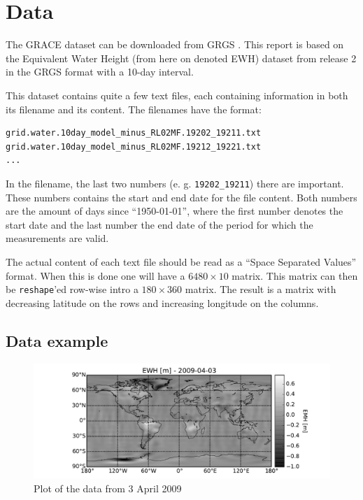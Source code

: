 \section{Data}

The GRACE dataset can be downloaded from GRGS \cite{GRACE-data-source}.
This report is based on the Equivalent Water Height (from here on denoted EWH)  dataset  from release 2 in the GRGS format with a 10-day interval.

This dataset contains quite a few text files, each containing information in both its filename and its content.
The filenames have the format:

\begin{lstlisting}
grid.water.10day_model_minus_RL02MF.19202_19211.txt
grid.water.10day_model_minus_RL02MF.19212_19221.txt
...
\end{lstlisting}

In the filename, the last two numbers (e. g. \texttt{19202\_19211}) there are important.
These numbers contains the start and end date for the file content.
Both numbers are the amount of days since ``1950-01-01'', where the first number denotes the start date and the last number the end date of the period for which the measurements are valid. \cite{GRACE-data-format-dates}

The actual content of each text file should be read as a ``Space Separated Values'' format.
When this is done one will have a $6480 \times 10$ matrix. 
This matrix can then be \texttt{reshape}'ed row-wise intro a $180 \times 360$ matrix.
The result is a matrix with decreasing latitude on the rows and increasing longitude on the columns. \cite{GRACE-data-format-grids}

\subsection{Data example}

\begin{figure}[H]
	\centering
	\includegraphics[width=\textwidth]{figures/data-example-world}
	\caption{Plot of the data from 3 April 2009}
	\label{fig:data-example-world}
\end{figure}

